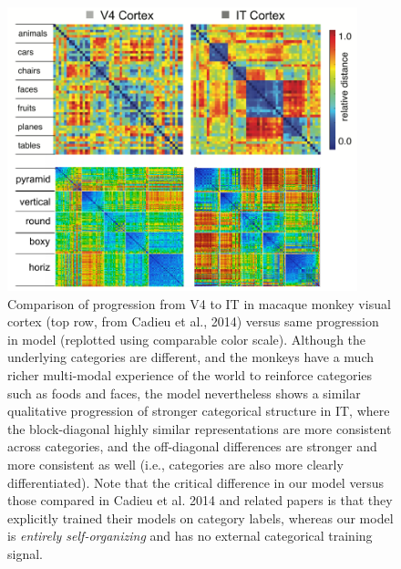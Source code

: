 \documentclass[11pt,twoside]{article}
\newif\myifpdf
\begin{document}
\begin{figure}
  \centering\includegraphics[width=4in]{fig_05} %
  \caption{Comparison of progression from V4 to IT in macaque monkey visual cortex (top row, from Cadieu et al., 2014) versus same progression in model (replotted using comparable color scale).  Although the underlying categories are different, and the monkeys have a much richer multi-modal experience of the world to reinforce categories such as foods and faces, the model nevertheless shows a similar qualitative progression of stronger categorical structure in IT, where the block-diagonal highly similar representations are more consistent across categories, and the off-diagonal differences are stronger and more consistent as well (i.e., categories are also more clearly differentiated).  Note that the critical difference in our model versus those compared in Cadieu et al. 2014 and related papers is that they explicitly trained their models on category labels, whereas our model is \emph{entirely self-organizing} and has no external categorical training signal.}
  \label{fig.macaque}
\end{figure}
\end{document}
